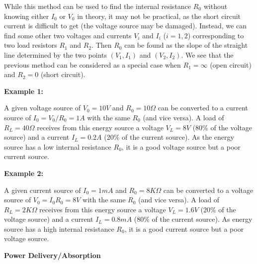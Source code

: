 \documentclass{article}
\begin{document}

While this method can be used to find the internal resistance $R_0$ 
without knowing either $I_0$ or $V_0$ in theory, it may not be practical, 
as the short circuit current is difficult to get (the voltage source may 
be damaged). Instead, we can find some other two voltages and currents 
$V_i$ and $I_i$ ($i=1,2$) corresponding to two load resistors $R_1$ and 
$R_2$. Then $R_0$ can be found as the slope of the straight line determined 
by the two points $(V_1, I_1)$ and $(V_2, I_2)$. We see that the previous 
method can be considered as a special case when $R_1=\infty$ (open circuit) 
and $R_2=0$ (short circuit).

{\bf Example 1:} 

A given voltage source of $V_0=10V$ and $R_0=10\Omega$ can be converted to a 
current source of $I_0=V_0/R_0=1A$ with the same $R_0$ (and vice versa). A load 
of $R_L=40\Omega$ receives from this energy source a voltage $V_L=8V$ (80\% of 
the voltage source) and a current $I_L=0.2A$ (20\% of the current source). As 
the energy source has a low internal resistance $R_0$, it is a good voltage 
source but a poor current source.


{\bf Example 2:} 

A given current source of $I_0=1 mA$ and $R_0=8 K\Omega$ can be converted to a 
voltage source of $V_0=I_0 R_0=8V$ with the same $R_0$ (and vice versa). A load 
of $R_L=2 K\Omega$ receives from this energy source a voltage $V_L=1.6V$ (20\%
of the voltage source) and a current $I_L=0.8 mA$ (80\% of the current source). 
As energy source has a high internal resistance $R_0$, it is a good current 
source but a poor voltage source.
				   

{\bf Power Delivery/Absorption}
\end{document}
